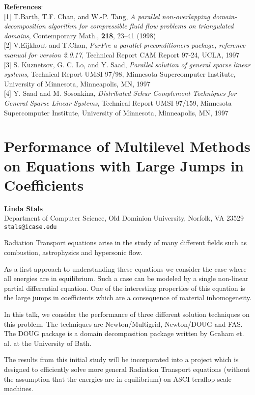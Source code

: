 \documentclass[11pt]{article}
\newcommand{\nextab}[4]{
	\section{#2}
	{\bf #1} \\ \nopagebreak
	{#3} \\ \nopagebreak
	{\tt #4} \nopagebreak
	}
\begin{document}
{\bf References}:
\\{}
[1] T.Barth, T.F. Chan, and W.-P. Tang,
{\em A parallel non-overlapping domain-decomposition algorithm
for compressible fluid flow problems on triangulated domains},
Contemporary Math., {\bf 218}, 23--41 (1998)
\\{}
[2] V.Eijkhout and T.Chan,
{\em ParPre a parallel preconditioners package, reference manual
for version 2.0.17}, Technical Report CAM Report 97-24, UCLA, 1997
\\{}
[3]
S. Kuznetsov, G. C. Lo, and Y. Saad,
{\em Parallel solution of general sparse linear systems},
Technical Report UMSI 97/98, Minnesota Supercomputer Institute,
  University of Minnesota, Minneapolis, MN, 1997
\\{}
[4] Y. Saad and M. Sosonkina,
	{\em Distributed Schur Complement Techniques for General
	Sparse Linear Systems}, Technical Report UMSI 97/159,
	Minnesota Supercomputer Institute,
	University of Minnesota, Minneapolis, MN, 1997


\nextab{Linda Stals}
	{Performance of Multilevel Methods on Equations with Large
		Jumps in Coefficients}
	{Department of Computer Science,
		     Old Dominion University, Norfolk, VA 23529}
	{stals@icase.edu}

Radiation Transport equations arise in the study of many different
fields such as combustion, astrophysics and hypersonic flow.

As a first approach to understanding these equations we consider the
case where all energies are in equilibrium. Such a case can be modeled
by a single non-linear partial differential equation. One of the
interesting properties of this equation is the large jumps in
coefficients which are a consequence of material inhomogeneity.

In this talk, we consider the performance of three different solution
techniques on this problem. The techniques are Newton/Multigrid,
Newton/DOUG and FAS. The DOUG package is a domain decomposition package
written by Graham et. al. at the University of Bath.

The results from this initial study will be incorporated into a project
which is designed to efficiently solve more general Radiation Transport
equations (without the assumption that the energies are in equilibrium)
on ASCI teraflop-scale machines.

\end{document}
